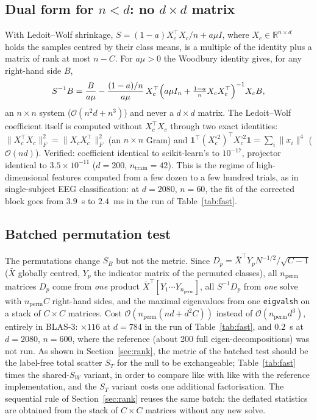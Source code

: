 \documentclass[11pt,a4paper]{article}
\theoremstyle{plain}
\theoremstyle{definition}
\theoremstyle{remark}
\newcommand{\R}{\mathbb R}
\newcommand{\T}{\top}
\begin{document}
\subsection{Dual form for \texorpdfstring{$n<d$}{n<d}: no \texorpdfstring{$d\times d$}{dxd} matrix}
With Ledoit--Wolf shrinkage, $S=(1-a)X_c^\T X_c/n+a\mu I$, where
$X_c\in\R^{n\times d}$ holds the samples centred by their class means, is a
multiple of the identity plus a matrix of rank at most $n-C$. For $a\mu>0$
the Woodbury identity gives, for any right-hand side $B$,
\begin{equation}
  S^{-1}B=\frac{B}{a\mu}-\frac{(1-a)/n}{a\mu}\,X_c^\T\Bigl(a\mu I_n+\tfrac{1-a}{n}X_cX_c^\T\Bigr)^{-1}X_cB,
  \label{eq:woodbury}
\end{equation}
an $n\times n$ system ($\mathcal O(n^2d+n^3)$) and never a $d\times d$
matrix. The Ledoit--Wolf coefficient itself is computed without $X_c^\T X_c$
through two exact identities: $\|X_c^\T X_c\|_F^2=\|X_cX_c^\T\|_F^2$ (an
$n\times n$ Gram) and $\mathbf 1^\T(X_c^{\circ2})^\T X_c^{\circ2}\mathbf 1=\sum_i\|x_i\|^4$
($\mathcal O(nd)$). Verified: coefficient identical to scikit-learn's to
$10^{-17}$, projector identical to $3.5\times10^{-11}$ ($d=200$,
$n_{\mathrm{train}}=42$). This is the regime of high-dimensional features
computed from a few dozen to a few hundred trials, as in single-subject EEG
classification: at $d=2080$, $n=60$, the fit of the corrected block goes
from $3.9$~s to $2.4$~ms in the run of Table~\ref{tab:fast}.

\subsection{Batched permutation test}
The permutations change $S_B$ but not the metric. Since
$D_p=\bar X^\T Y_pN^{-1/2}/\sqrt{C-1}$ ($\bar X$ globally centred, $Y_p$ the
indicator matrix of the permuted classes), all $n_{\mathrm{perm}}$ matrices
$D_p$ come from \emph{one} product $\bar X^\T[Y_1\cdots Y_{n_{\mathrm{perm}}}]$,
all $S^{-1}D_p$ from \emph{one} solve with $n_{\mathrm{perm}}C$ right-hand
sides, and the maximal eigenvalues from one \texttt{eigvalsh} on a stack of
$C\times C$ matrices. Cost $\mathcal O(n_{\mathrm{perm}}(nd+d^2C))$ instead of
$\mathcal O(n_{\mathrm{perm}}d^3)$, entirely in BLAS-3: $\times116$ at
$d=784$ in the run of Table~\ref{tab:fast}, and $0.2$~s at $d=2080$,
$n=600$, where the reference (about 200 full eigen-decompositions) was not
run. As shown in Section~\ref{sec:rank}, the metric of the batched
test should be the label-free total scatter $S_T$ for the null to be
exchangeable; Table~\ref{tab:fast} times the shared-$S_W$ variant, in order
to compare like with like with the reference implementation, and the $S_T$
variant costs one additional factorisation. The sequential rule of
Section~\ref{sec:rank} reuses the same batch: the deflated statistics are
obtained from the stack of $C\times C$ matrices without any new solve.
\end{document}
